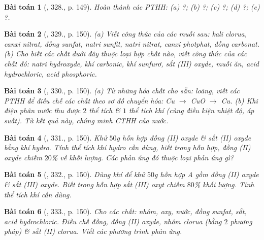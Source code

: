 \documentclass{article}
\newtheorem{baitoan}{Bài toán}
\begin{document}
\begin{baitoan}[\cite{An_400_BT_Hoa_Hoc_8_2020}, 328., p. 149]
	Hoàn thành các PTHH: (a) \emph{} ?; (b) \emph{} ?; (c) \emph{} ?; (d) \emph{} ?; (e) \emph{} ?.
\end{baitoan}

\begin{baitoan}[\cite{An_400_BT_Hoa_Hoc_8_2020}, 329., p. 150]
	(a) Viết công thức của các muối sau: kali clorua, canxi nitrat, đồng sunfat, natri sunfit, natri nitrat, canxi photphat, đồng carbonat. (b) Cho biết các chất dưới đây thuộc loại hợp chất nào, viết công thức của các chất đó: natri hydroxyde, khí carbonic, khí sunfurơ, sắt (III) oxyde, muối ăn, acid hydrochloric, acid phosphoric.
\end{baitoan}

\begin{baitoan}[\cite{An_400_BT_Hoa_Hoc_8_2020}, 330., p. 150]
	(a) Từ những hóa chất cho sẵn: \emph{} loãng, viết các PTHH để điều chế các chất theo sơ đồ chuyển hóa: \emph{Cu $\to$ CuO $\to$ Cu}. (b) Khi điện phân nước thu được $2$ thể tích \emph{} \& $1$ thể tích khí \emph{} (cùng điều kiện nhiệt độ, áp suất). Từ kết quả này, chứng minh CTHH của nước.
\end{baitoan}

\begin{baitoan}[\cite{An_400_BT_Hoa_Hoc_8_2020}, 331., p. 150]
	Khử $50$\emph{g} hỗn hợp đồng (II) oxyde \& sắt (II) oxyde bằng khí hydro. Tính thể tích khí hydro cần dùng, biết trong hỗn hợp, đồng (II) oxyde chiếm $20$\% về khối lượng. Các phản ứng đó thuộc loại phản ứng gì?
\end{baitoan}

\begin{baitoan}[\cite{An_400_BT_Hoa_Hoc_8_2020}, 332., p. 150]
	Dùng khí \emph{} để khử $50$\emph{g} hỗn hợp A gồm đồng (II) oxyde \& sắt (III) oxyde. Biết trong hỗn hợp sắt (III) oxyt chiếm $80$\% khối lượng. Tính thể tích khí \emph{} cần dùng.
\end{baitoan}

\begin{baitoan}[\cite{An_400_BT_Hoa_Hoc_8_2020}, 333., p. 150]
	Cho các chất: nhôm, oxy, nước, đồng sunfat, sắt, acid hydrochloric. Điều chế đồng, đồng (II) oxyde, nhôm clorua (bằng $2$ phương pháp) \& sắt (II) clorua. Viết các phương trình phản ứng.
\end{baitoan}
\end{document}
